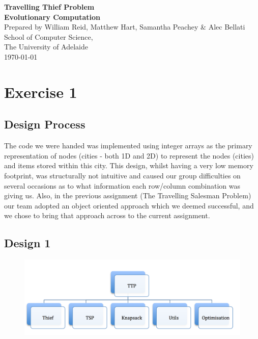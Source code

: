 \documentclass[a4paper,12pt]{article}
\begin{document}
\begin{center}
{\LARGE\bf Travelling Thief Problem}\\
\vspace{0.5cm}
{\Large\bf Evolutionary Computation}\\
\vspace{1cm}
Prepared by William Reid, Matthew Hart, Samantha Peachey \& Alec Bellati\\
\vspace{1cm}
School of Computer Science,\\
The University of Adelaide\\
\vspace{1cm}
\today
\end{center}



\section*{Exercise 1}
\subsection*{Design Process}
The code we were handed was implemented using integer arrays as the primary representation of nodes (cities - both 1D and 2D) to represent the nodes (cities) and items stored within this city. This design, whilst having a very low memory footprint, was structurally not intuitive and caused our group difficulties on several occasions as to what information each row/column combination was giving us. Also, in the previous assignment (The Travelling Salesman Problem) our team adopted an object oriented approach which we deemed successful, and we chose to bring that approach across to the current assignment.

\subsection*{Design 1}
\begin{figure}[h]
\centering
\includegraphics[width=120mm]{design1.png}
\end{figure}
\end{document}
